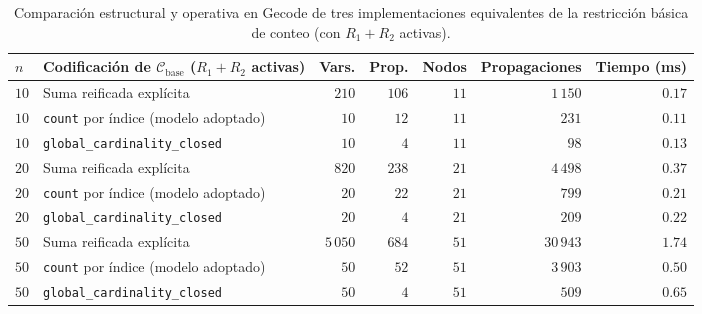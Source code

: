 \begin{table}[htbp]
    \centering
    \small
    \setlength{\tabcolsep}{4.2pt}
    \begin{tabular}{llrrrrr}
        \toprule
        $n$ & Codificación de $\mathcal{C}_{\text{base}}$ ($R_1 + R_2$ activas) & Vars. & Prop. & Nodos & Propagaciones & Tiempo (ms) \\
        \midrule
        $10$ & Suma reificada explícita                    & $210$    & $106$ & $11$ & $1\,150$  & $0.17$ \\
        $10$ & \texttt{count} por índice (modelo adoptado) & $10$     & $12$  & $11$ & $231$     & $0.11$ \\
        $10$ & \texttt{global\_cardinality\_closed}        & $10$     & $4$   & $11$ & $98$      & $0.13$ \\
        \midrule
        $20$ & Suma reificada explícita                    & $820$    & $238$ & $21$ & $4\,498$  & $0.37$ \\
        $20$ & \texttt{count} por índice (modelo adoptado) & $20$     & $22$  & $21$ & $799$     & $0.21$ \\
        $20$ & \texttt{global\_cardinality\_closed}        & $20$     & $4$   & $21$ & $209$     & $0.22$ \\
        \midrule
        $50$ & Suma reificada explícita                    & $5\,050$ & $684$ & $51$ & $30\,943$ & $1.74$ \\
        $50$ & \texttt{count} por índice (modelo adoptado) & $50$     & $52$  & $51$ & $3\,903$  & $0.50$ \\
        $50$ & \texttt{global\_cardinality\_closed}        & $50$     & $4$   & $51$ & $509$     & $0.65$ \\
        \bottomrule
    \end{tabular}
    \caption{Comparación estructural y operativa en Gecode de tres implementaciones equivalentes de la restricción básica de conteo (con $R_1 + R_2$ activas).}
    \label{tab:secuencia_formulaciones}
\end{table}

